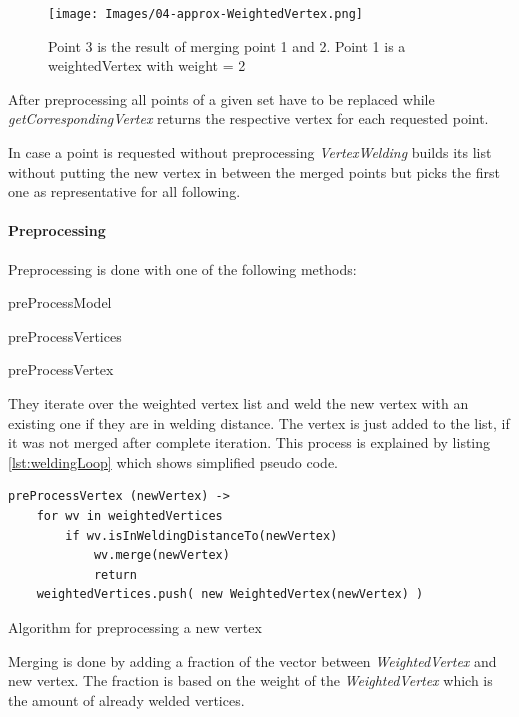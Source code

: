 \documentclass[../ClassicThesis.tex]{subfiles}
\begin{document}
\begin{figure}
\texttt{[image: Images/04-approx-WeightedVertex.png]}
\caption{Point 3 is the result of merging point 1 and 2. Point 1 is a weightedVertex with weight = 2}
\label{fig:weightedVertex}
\end{figure}

After preprocessing all points of a given set have to be replaced while \emph{getCorrespondingVertex} returns the respective vertex for each requested point.

In case a point is requested without preprocessing \emph{VertexWelding} builds its list without putting the new vertex in between the merged points but picks the first one as representative for all following.




\paragraph{Preprocessing}

Preprocessing is done with one of the following methods:

\begin{description}
    \item preProcessModel
    \item preProcessVertices
    \item preProcessVertex
\end{description}

They iterate over the weighted vertex list and weld the new vertex with an existing one if they are in welding distance. The vertex is just added to the list, if it was not merged after complete iteration. This process is explained by listing \ref{lst:weldingLoop} which shows simplified pseudo code.

\begin{listing}[!h]
\centering
\begin{verbatim}
preProcessVertex (newVertex) ->
    for wv in weightedVertices
        if wv.isInWeldingDistanceTo(newVertex)
            wv.merge(newVertex)
            return
    weightedVertices.push( new WeightedVertex(newVertex) )
\end{verbatim}
\caption{Algorithm for preprocessing a new vertex}
\label{lst:weldingLoop}
\end{listing}

Merging is done by adding a fraction of the vector between \emph{WeightedVertex} and new vertex. The fraction is based on the weight of the \emph{WeightedVertex} which is the amount of already welded vertices.
\end{document}
